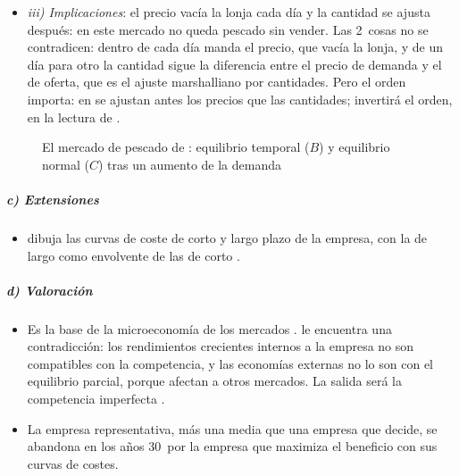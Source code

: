 \documentclass[11pt]{article}
\begin{document}
\begin{itemize}
\begin{itemize}
  \item \emph{El ajuste}: la cantidad aumenta si el precio de demanda supera al de oferta\nocite{Marshall1890Principles}: es el \emph{ajuste marshalliano}, por cantidades, frente al \emph{walrasiano}, por precios \eqref{eq:tanteo}. Los 2~dan veredictos distintos sobre la estabilidad cuando la oferta es decreciente .
  \end{itemize}
\item \emph{iii) Implicaciones}: el precio vacía la lonja cada día y la cantidad se ajusta después: en este mercado no queda pescado sin vender. Las 2~cosas no se contradicen: dentro de cada día manda el precio, que vacía la lonja, y de un día para otro la cantidad sigue la diferencia entre el precio de demanda y el de oferta, que es el ajuste marshalliano por cantidades. Pero el orden importa: en  se ajustan antes los precios que las cantidades;  invertirá el orden, en la lectura de \textcite{Leijonhufvud1968Keynesian} .
\end{itemize}

\begin{figure}[H]
\centering
\caption{El mercado de pescado de : equilibrio temporal ($B$) y equilibrio normal ($C$) tras un aumento de la demanda}\label{fig:marshall-periodos}
\end{figure}

\subparagraph{c) Extensiones}

\begin{itemize}
\item \textcite{Viner1931Cost} dibuja las curvas de coste de corto y largo plazo de la empresa, con la de largo como envolvente de las de corto .
\end{itemize}

\subparagraph{d) Valoración}

\begin{itemize}
\item Es la base de la microeconomía de los mercados . \textcite{Sraffa1926Laws} le encuentra una contradicción: los rendimientos crecientes internos a la empresa no son compatibles con la competencia, y las economías externas no lo son con el equilibrio parcial, porque afectan a otros mercados. La salida será la competencia imperfecta .
\item La empresa representativa, más una media que una empresa que decide, se abandona en los años 30~por la empresa que maximiza el beneficio con sus curvas de costes.
\end{itemize}
\end{document}
